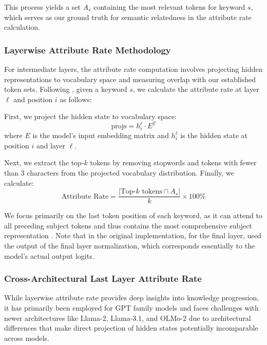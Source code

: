 \documentclass[10pt]{article}
\begin{document}
This process yields a set $A_s$ containing the most relevant tokens for keyword $s$, which serves as our ground truth for semantic relatedness in the attribute rate calculation.

\subsubsection{Layerwise Attribute Rate Methodology}

For intermediate layers, the attribute rate computation involves projecting hidden representations to vocabulary space and measuring overlap with our established token sets. Following \citet{geva2023dissecting}, given a keyword $s$, we calculate the attribute rate at layer $\ell$ and position $i$ as follows:

First, we project the hidden state to vocabulary space:
\begin{equation}
\text{projs} = h_i^\ell \cdot E^T
\end{equation}
where $E$ is the model's input embedding matrix and $h_i^\ell$ is the hidden state at position $i$ and layer $\ell$.

Next, we extract the top-$k$ tokens by removing stopwords and tokens with fewer than 3 characters from the projected vocabulary distribution. Finally, we calculate:
\begin{equation}
\text{Attribute Rate} = \frac{|\text{Top-}k \text{ tokens} \cap A_s|}{k} \times 100\%
\end{equation}

We focus primarily on the last token position of each keyword, as it can attend to all preceding subject tokens and thus contains the most comprehensive subject representation \citep{geva2023dissecting}. Note that in the original implementation, for the final layer, \citet{geva2023dissecting} used the output of the final layer normalization, which corresponds essentially to the model's actual output logits.

\subsubsection{Cross-Architectural Last Layer Attribute Rate}

While layerwise attribute rate provides deep insights into knowledge progression, it has primarily been employed for GPT family models \citep{nostalgebraist2020, dar2022analyzing, geva2023dissecting} and faces challenges with newer architectures like Llama-2, Llama-3.1, and OLMo-2 due to architectural differences that make direct projection of hidden states potentially incomparable across models.
\end{document}
